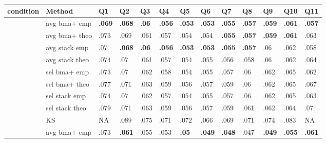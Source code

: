 \documentclass[border={-20pt 28pt 20pt -20pt}]{standalone}
\begin{document}
                   \pagecolor{Mycolor2}
                   \renewcommand{\arraystretch}{1.1} 
\centering\begingroup\fontsize{9}{11}\selectfont

\begin{tabular}{>{\centering\arraybackslash}p{4.4em}>{\centering\arraybackslash}p{7em}>{\centering\arraybackslash}p{1.8em}>{\centering\arraybackslash}p{1.8em}>{\centering\arraybackslash}p{1.8em}>{\centering\arraybackslash}p{1.8em}>{\centering\arraybackslash}p{1.8em}>{\centering\arraybackslash}p{1.8em}>{\centering\arraybackslash}p{1.8em}>{\centering\arraybackslash}p{1.8em}>{\centering\arraybackslash}p{1.8em}>{\centering\arraybackslash}p{1.8em}>{\centering\arraybackslash}p{1.8em}}
\toprule
\textbf{condition} & \textbf{Method} & \textbf{Q1} & \textbf{Q2} & \textbf{Q3} & \textbf{Q4} & \textbf{Q5} & \textbf{Q6} & \textbf{Q7} & \textbf{Q8} & \textbf{Q9} & \textbf{Q10} & \textbf{Q11}\\
\midrule
 & avg bma+ emp & \textbf{.069} & \textbf{.068} & \textbf{.06} & \textbf{.056} & \textbf{.053} & \textbf{.053} & \textbf{.055} & \textbf{.057} & \textbf{.059} & \textbf{.061} & \textbf{.057}\\

 & avg bma+ theo & .073 & .069 & .061 & .057 & .054 & .054 & \textbf{.055} & \textbf{.057} & \textbf{.059} & \textbf{.061} & .063\\

 & avg stack emp & .07 & \textbf{.068} & \textbf{.06} & \textbf{.056} & \textbf{.053} & \textbf{.053} & \textbf{.055} & \textbf{.057} & .06 & .062 & .058\\

 & avg stack theo & .074 & .07 & .061 & .057 & .054 & .055 & .056 & .058 & .06 & .062 & .064\\

 & sel bma+ emp & .073 & .07 & .062 & .058 & .054 & .055 & .057 & .06 & .062 & .065 & .062\\

 & sel bma+ theo & .077 & .071 & .063 & .059 & .056 & .057 & .059 & .06 & .062 & .065 & .067\\

 & sel stack emp & .074 & .07 & .062 & .057 & .054 & .055 & .057 & .06 & .062 & .065 & .063\\

 & sel stack theo & .079 & .071 & .063 & .059 & .056 & .057 & .059 & .061 & .062 & .064 & .07\\

\multirow{-9}{4.4em}{\centering\arraybackslash \textbf{I = 10  N = 100}} & KS & NA & .089 & .075 & .071 & .072 & .066 & .069 & .071 & .074 & .083 & NA\\
\cmidrule{1-13}
 & avg bma+ emp & .073 & \textbf{.061} & .055 & .053 & \textbf{.05} & \textbf{.049} & \textbf{.048} & .047 & \textbf{.049} & \textbf{.055} & \textbf{.061}\\


\end{tabular}
\end{document}
